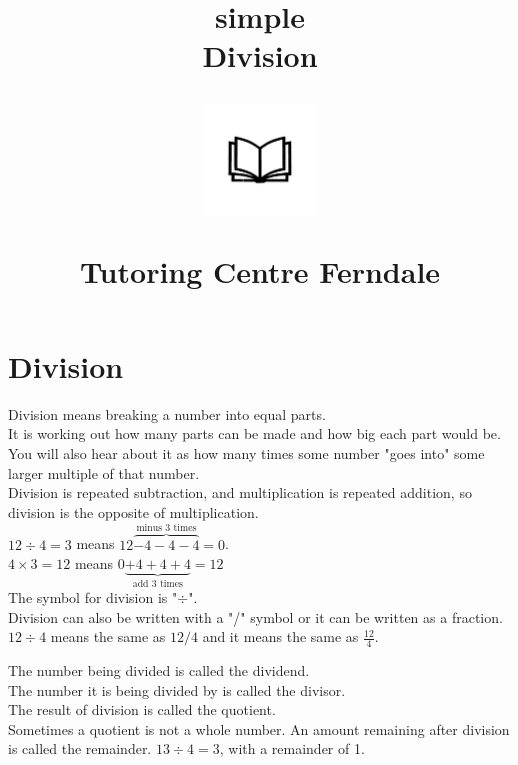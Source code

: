\documentclass{article}
\author{}
\date{}
\title{simple\\Division\\
\vspace{28pt}
\begin{center}
\includegraphics[width=4em]{ApS_logo.png}
\end{center}
\begin{normalsize}Tutoring Centre Ferndale\end{normalsize}}
\begin{document}
\maketitle
\pagebreak
\tableofcontents

\pagebreak

\section{Division}

Division means breaking a number into equal parts.\\

It is  working out how many parts can be made and how big each part would be.\\

You will also hear about it as how many times some number "goes into" some larger multiple of that number.\\

Division is repeated subtraction, and multiplication is repeated addition, so division is the opposite of multiplication.\\

$12 \div 4 = 3$ means $12 \overbrace{- 4 - 4 - 4}^{\textrm{minus\ 3\ times}} = 0$.\\

$4 \times 3 = 12$ means $0\underbrace{+ 4 + 4 + 4}_{\textrm{add\ 3\ times}} = 12$\\

\vspace{16pt}
The symbol for division is "$\div$".\\

Division can also be written with a "/" symbol or it can be written as a fraction. $12 \div 4$ means the same as $12/4$ and it means the same as $\frac{12}{4}$.\\

\pagebreak

The number being divided is called the dividend.\\

The number it is being divided by is called the divisor.\\

The result of division is called the quotient.\\

Sometimes a quotient is not a whole number. An amount remaining after division is called the remainder. $13 \div 4 = 3$, with a remainder of 1.\\
\end{document}
